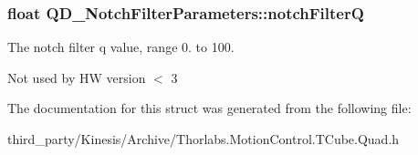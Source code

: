 \subsubsection[{\texorpdfstring{notch\+FilterQ}{notchFilterQ}}]{\setlength{\rightskip}{0pt plus 5cm}float Q\+D\+\_\+\+Notch\+Filter\+Parameters\+::notch\+FilterQ}\hypertarget{struct_q_d___notch_filter_parameters_a75d88131cfcbc72f577a597cf9e4fcd7}{}\label{struct_q_d___notch_filter_parameters_a75d88131cfcbc72f577a597cf9e4fcd7}


The notch filter q value, range 0. to 100. 

Not used by HW version $<$ 3

The documentation for this struct was generated from the following file\+:\begin{DoxyCompactItemize}
\item 
third\+\_\+party/\+Kinesis/\+Archive/Thorlabs.\+Motion\+Control.\+T\+Cube.\+Quad.\+h\end{DoxyCompactItemize}
